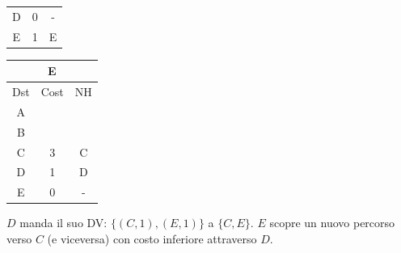 \documentclass[10pt]{article}
\begin{document}
\begin{table}[h!]
\begin{tabular}{|c||c||c|}
					D & 0 & - \\
					E & 1 & E \\
					\hline
				\end{tabular}
				\begin{tabular}{|c||c||c|}
					\hline
					\multicolumn{3}{|c|}{E} \\
					\hline
					Dst & Cost & NH \\
					\hline
					A &   &   \\
					B &   &   \\
					C & 3 & C \\
					D & 1 & D \\
					E & 0 & - \\
					\hline
				\end{tabular}
			\end{table}
			\newline \newline
			$D$ manda il suo DV: $\{(C,1),(E,1)\}$ a $\{C,E\}$.
			\newline
			$E$ scopre un nuovo percorso verso $C$ (e viceversa) con costo inferiore attraverso $D$.
\end{document}
